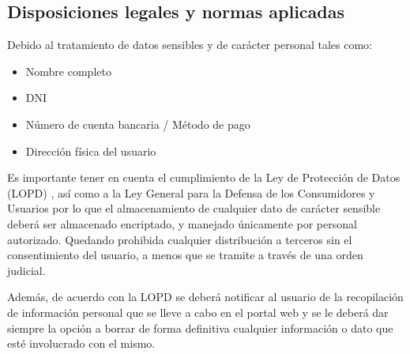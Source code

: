 \subsection{Disposiciones legales y normas aplicadas}
\par Debido al tratamiento de datos sensibles y de carácter personal tales como:
\begin{itemize}
	\item Nombre completo
	\item DNI
	\item Número de cuenta bancaria / Método de pago
	\item Dirección física del usuario
\end{itemize}
\par Es importante tener en cuenta el cumplimiento de la Ley de Protección de Datos (LOPD) \cite{LAW:LOPD}, así como a la Ley General para la Defensa de los Consumidores y Usuarios \cite{LAW:LGDCU}  por lo que el almacenamiento de cualquier dato de carácter sensible deberá ser almacenado encriptado, y manejado únicamente por personal autorizado. Quedando prohibida cualquier distribución a terceros sin el consentimiento del usuario, a menos que se tramite a través de una orden judicial.

\par Además, de acuerdo con la LOPD se deberá notificar al usuario de la recopilación de información personal que se lleve a cabo en el portal web y se le deberá dar siempre la opción a borrar de forma definitiva cualquier información o dato que esté involucrado con el mismo.
